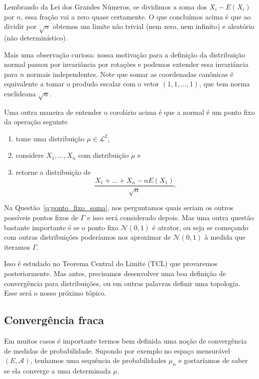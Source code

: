 Lembrando da Lei dos Grandes Números, se dividimos a soma dos $X_i - E(X_i)$ por $n$, essa fração vai a zero quase certamente.
O que concluímos acima é que ao dividir por $\sqrt{n}$ obtemos um limite não trivial (nem zero, nem infinito) e aleatório (não determinístico).

Mais uma observação curiosa: nossa motivação para a definição da distribuição normal passou por invariância por rotações e podemos extender essa invariância para $n$ normais independentes.
Note que somar as coordenadas canônicas é equivalente a tomar o produdo escalar com o vetor $(1,1,\dots,1)$, que tem norma euclideana $\sqrt{n}$.

Uma outra maneira de entender o corolário acima é que a normal é um ponto fixo da operação seguinte
\begin{enumerate}[\quad a)]
\item tome uma distribuição $\mu \in \mathcal{L}^2$,
\item considere $X_1, \dots, X_n$ \iid com distribuição $\mu$ e
\item retorne a distribuição de
  \begin{equation}
    \frac{X_1 + \dots + X_n - n E(X_1)}{\sqrt{n}}.
  \end{equation}
\end{enumerate}

Na Questão~\ref{q:ponto_fixo_soma}, nos perguntamos quais seriam os outros possíveis pontos fixos de $\Gamma$ e isso será considerado depois.
Mas uma outra questão bastante importante é se o ponto fixo $\mathcal{N}(0,1)$ é atrator, ou seja se começando com outras distribuições poderíamos nos aproximar de $\mathcal{N}(0,1)$ à medida que iteramos $\Gamma$.

Isso é estudado no Teorema Central do Limite (TCL) que provaremos posteriormente.
Mas antes, precisamos desenvolver uma boa definição de convergência para distribuições, ou em outras palavras definir uma topologia.
Esse será o nosso próximo tópico.

\subsection{Convergência fraca}

Em muitos casos é importante termos bem definida uma noção de convergência de medidas de probabilidade.
Supondo por exemplo no espaço mensurável $(E,\mathcal{A})$, tenhamos uma sequência de probabilidades $\mu_n$ e gostaríamos de saber se ela converge a uma determinada $\mu$.

